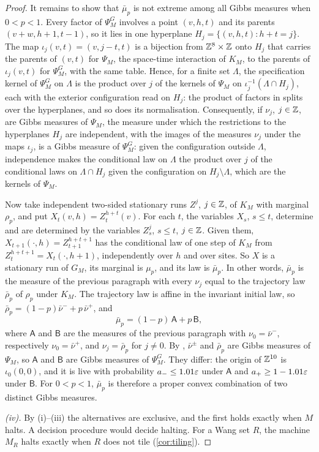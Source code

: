 \begin{proof}
It remains to show that $\bar\mu_p$ is not extreme among all Gibbs measures when $0<p<1$. Every factor of $\Psi^G_M$ involves a point $(v,h,t)$ and its parents $(v+w,h+1,t-1)$, so it lies in one hyperplane $H_j=\{(v,h,t):h+t=j\}$. The map $\iota_j(v,t)=(v,j-t,t)$ is a bijection from $\mathbb{Z}^8\times\mathbb{Z}$ onto $H_j$ that carries the parents of $(v,t)$ for $\Psi_M$, the space-time interaction of $K_M$, to the parents of $\iota_j(v,t)$ for $\Psi^G_M$, with the same table. Hence, for a finite set $\Lambda$, the specification kernel of $\Psi^G_M$ on $\Lambda$ is the product over $j$ of the kernels of $\Psi_M$ on $\iota_j^{-1}(\Lambda\cap H_j)$, each with the exterior configuration read on $H_j$: the product of factors in \cite[eq.~(6)]{DM26} splits over the hyperplanes, and so does its normalisation. Consequently, if $\nu_j$, $j\in\mathbb{Z}$, are Gibbs measures of $\Psi_M$, the measure under which the restrictions to the hyperplanes $H_j$ are independent, with the images of the measures $\nu_j$ under the maps $\iota_j$, is a Gibbs measure of $\Psi^G_M$: given the configuration outside $\Lambda$, independence makes the conditional law on $\Lambda$ the product over $j$ of the conditional laws on $\Lambda\cap H_j$ given the configuration on $H_j\setminus\Lambda$, which are the kernels of $\Psi_M$.

Now take independent two-sided stationary runs $Z^j$, $j\in\mathbb{Z}$, of $K_M$ with marginal $\rho_p$, and put $X_t(v,h)=Z^{h+t}_t(v)$. For each $t$, the variables $X_s$, $s\le t$, determine and are determined by the variables $Z^j_s$, $s\le t$, $j\in\mathbb{Z}$. Given them, $X_{t+1}(\cdot,h)=Z^{h+t+1}_{t+1}$ has the conditional law of one step of $K_M$ from $Z^{h+t+1}_t=X_t(\cdot,h+1)$, independently over $h$ and over sites. So $X$ is a stationary run of $G_M$, its marginal is $\mu_p$, and its law is $\bar\mu_p$. In other words, $\bar\mu_p$ is the measure of the previous paragraph with every $\nu_j$ equal to the trajectory law $\bar\rho_p$ of $\rho_p$ under $K_M$. The trajectory law is affine in the invariant initial law, so $\bar\rho_p=(1-p)\bar\nu^-+p\,\bar\nu^+$, and
\[
\bar\mu_p=(1-p)\,\mathsf A+p\,\mathsf B,
\]
where $\mathsf A$ and $\mathsf B$ are the measures of the previous paragraph with $\nu_0=\bar\nu^-$, respectively $\nu_0=\bar\nu^+$, and $\nu_j=\bar\rho_p$ for $j\ne0$. By \cite[Lemma~2.4]{DM26}, $\bar\nu^\pm$ and $\bar\rho_p$ are Gibbs measures of $\Psi_M$, so $\mathsf A$ and $\mathsf B$ are Gibbs measures of $\Psi^G_M$. They differ: the origin of $\mathbb{Z}^{10}$ is $\iota_0(0,0)$, and it is live with probability $a_-\le1.01\varepsilon$ under $\mathsf A$ and $a_+\ge1-1.01\varepsilon$ under $\mathsf B$. For $0<p<1$, $\bar\mu_p$ is therefore a proper convex combination of two distinct Gibbs measures.

\emph{(iv).} By (i)--(iii) the alternatives are exclusive, and the first holds exactly when $M$ halts. A decision procedure would decide halting. For a Wang set $R$, the machine $M_R$ halts exactly when $R$ does not tile (\cref{cor:tiling}).
\end{proof}

